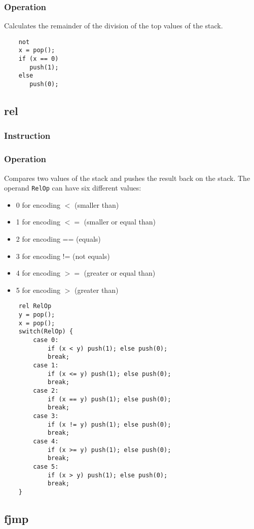 \subsubsection{Operation}
Calculates the remainder of the division of the top values of the stack.

	\begin{lstlisting}
	not
	x = pop();
	if (x == 0)
	   push(1);
	else
	   push(0);
	\end{lstlisting}

\subsection{rel}
\subsubsection{Instruction}

\subsubsection{Operation}
Compares two values of the stack and pushes the result back on the stack. The operand \lstinline$RelOp$ can have six different values:
\begin{itemize}
	\item 0 for encoding $<$ (smaller than)
	\item 1 for encoding $<=$ (smaller or equal than)
	\item 2 for encoding == (equals)
	\item 3 for encoding != (not equals)
	\item 4 for encoding $>=$ (greater or equal than)
	\item 5 for encoding $>$ (greater than)
\end{itemize}
	\begin{lstlisting}
	rel RelOp
	y = pop();
	x = pop();
	switch(RelOp) {
		case 0:
			if (x < y) push(1); else push(0);
			break;
		case 1:
			if (x <= y) push(1); else push(0);
			break;
		case 2:
			if (x == y) push(1); else push(0);
			break;
		case 3:
			if (x != y) push(1); else push(0);
			break;
		case 4:
			if (x >= y) push(1); else push(0);
			break;
		case 5:
			if (x > y) push(1); else push(0);
			break;
	}
	\end{lstlisting}

\subsection{fjmp}
